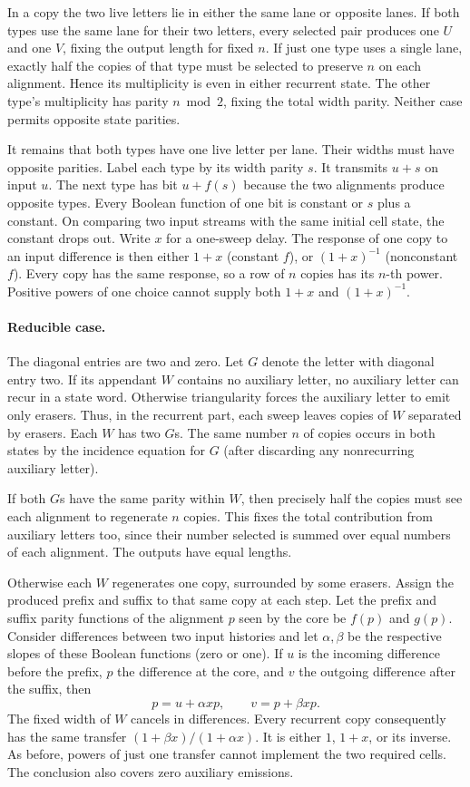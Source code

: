 \documentclass{article}
\begin{document}
In a copy the two live letters lie in either the same lane or opposite
lanes. If both types use the same lane for their two letters, every
selected pair produces one $U$ and one $V$, fixing the output length
for fixed $n$. If just one type uses a single lane, exactly half the
copies of that type must be selected to preserve $n$ on each alignment.
Hence its multiplicity is even in either recurrent state. The other
type's multiplicity has parity $n\bmod 2$, fixing the total width
parity. Neither case permits opposite state parities.

It remains that both types have one live letter per lane. Their widths
must have opposite parities. Label each type by its width parity $s$.
It transmits $u+s$ on input $u$. The next type has bit $u+f(s)$
because the two alignments produce opposite types. Every Boolean
function of one bit is constant or $s$ plus a constant. On comparing
two input streams with the same initial cell state, the constant
drops out. Write $x$ for a one-sweep delay. The response of one copy
to an input difference is then either $1+x$ (constant $f$), or
$(1+x)^{-1}$ (nonconstant $f$). Every copy has the same response,
so a row of $n$ copies has its $n$-th power. Positive powers of one
choice cannot supply both $1+x$ and $(1+x)^{-1}$.

\paragraph{Reducible case.}
The diagonal entries are two and zero. Let $G$ denote the letter
with diagonal entry two. If its appendant $W$ contains no auxiliary
letter, no auxiliary letter can recur in a state word. Otherwise
triangularity forces the auxiliary letter to emit only erasers. Thus,
in the recurrent part, each sweep leaves copies of $W$ separated
by erasers. Each $W$ has two $G$s. The same number $n$ of copies
occurs in both states by the incidence equation for $G$ (after
discarding any nonrecurring auxiliary letter).

If both $G$s have the same parity within $W$, then precisely half
the copies must see each alignment to regenerate $n$ copies. This
fixes the total contribution from auxiliary letters too, since their
number selected is summed over equal numbers of each alignment.
The outputs have equal lengths.

Otherwise each $W$ regenerates one copy, surrounded by some erasers.
Assign the produced prefix and suffix to that same copy at each step.
Let the prefix and suffix parity functions of the alignment $p$ seen
by the core be $f(p)$ and $g(p)$. Consider differences between two
input histories and let $\alpha,\beta$ be the respective slopes of
these Boolean functions (zero or one). If $u$ is the incoming
difference before the prefix, $p$ the difference at the core, and $v$
the outgoing difference after the suffix, then
\[
 p=u+\alpha x p,\qquad v=p+\beta x p.
\]
The fixed width of $W$ cancels in differences. Every recurrent
copy consequently has the same transfer
$(1+\beta x)/(1+\alpha x)$. It is either $1$, $1+x$, or its inverse.
As before, powers of just one transfer cannot implement the two
required cells. The conclusion also covers zero auxiliary emissions.
\end{document}
